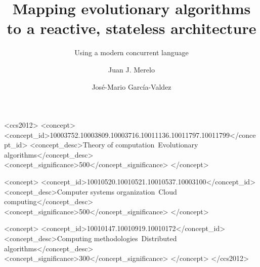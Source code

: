 \documentclass[sigconf]{acmart}
\begin{document}
\title{Mapping evolutionary algorithms to a reactive, stateless architecture}
\subtitle{Using a modern concurrent language}


\author{Juan J. Merelo}

\author{José-Mario García-Valdez}

\renewcommand{\shortauthors}{J. J. Merelo et al.}

\begin{abstract}
\end{abstract}

\begin{CCSXML}
<ccs2012>
<concept>
<concept_id>10003752.10003809.10003716.10011136.10011797.10011799</concept_id>
<concept_desc>Theory of computation~Evolutionary algorithms</concept_desc>
<concept_significance>500</concept_significance>
</concept>

<concept>
<concept_id>10010520.10010521.10010537.10003100</concept_id>
<concept_desc>Computer systems organization~Cloud computing</concept_desc>
<concept_significance>500</concept_significance>
</concept>

<concept>
<concept_id>10010147.10010919.10010172</concept_id>
<concept_desc>Computing methodologies~Distributed algorithms</concept_desc>
<concept_significance>300</concept_significance>
</concept>
</ccs2012>
\end{CCSXML}




\maketitle
\end{document}
